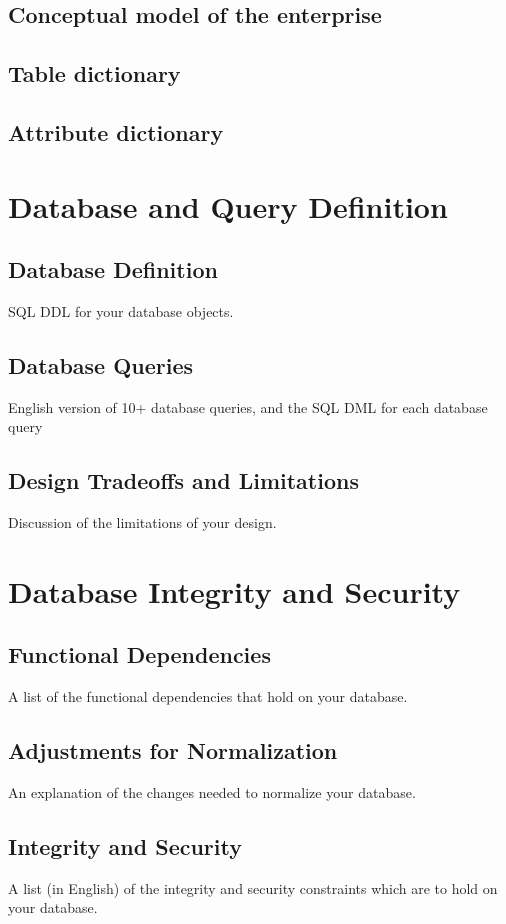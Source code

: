 \documentclass[11pt, a4paper]{report}
\begin{document}
\section{Conceptual model of the enterprise}
\section{Table dictionary}
\section{Attribute dictionary}

\chapter{Database and Query Definition}

\section{Database Definition}
    SQL DDL for your database objects.
\section{Database Queries}
    English version of 10+ database queries, and the SQL DML for each database query
\section{Design Tradeoffs and Limitations}
    Discussion of the limitations of your design.

\chapter{Database Integrity and Security}
\section{Functional Dependencies}
    A list of the functional dependencies that hold on your database.
\section{Adjustments for Normalization}
    An explanation of the changes needed to normalize your database.
\section{Integrity and Security}
    A list (in English) of the integrity and security constraints which are to hold on your database.
\end{document}
